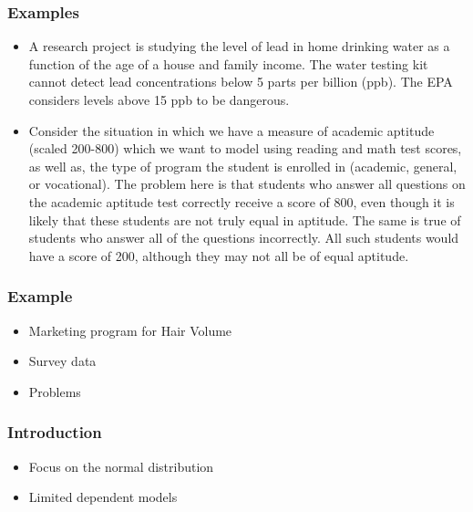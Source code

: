 \documentclass{beamer}
\newcommand{\1}{\mathbb{1}}
\newcommand{\N}{\mathbb{N}}
\begin{document}
\begin{frame}\frametitle{Examples}
\begin{itemize}
 \item A research project is studying the level of lead in home drinking water as a function of the age of a house and family income. The water testing kit cannot detect lead concentrations below 5 parts per billion (ppb). The EPA considers levels above 15 ppb to be dangerous. 
 \item Consider the situation in which we have a measure of academic aptitude (scaled 200-800) which we want to model using reading and math test scores, as well as, the type of program the student is enrolled in (academic, general, or vocational). The problem here is that students who answer all questions on the academic aptitude test correctly receive a score of 800, even though it is likely that these students are not truly equal in aptitude. The same is true of students who answer all of the questions incorrectly. All such students would have a score of 200, although they may not all be of equal aptitude.
\end{itemize}
\end{frame}

\begin{frame}\frametitle{Example}
 \begin{itemize}
  \item Marketing program for Hair Volume
  \item Survey data
  \item Problems
 \end{itemize}

\end{frame}


\begin{frame}\frametitle{Introduction}
\begin{itemize}
 \item Focus on the normal distribution
 \item Limited dependent models
\end{itemize}
\end{frame}

\end{document}
